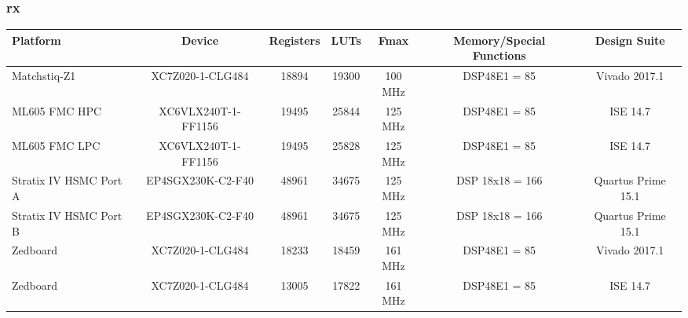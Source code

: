 \begin{scriptsize}
\subsubsection{rx}
\begin{tabular}{|P{1.8cm}|c|c|c|c|c|c|}
\hline
{}
Platform               & Device              & Registers & LUTs  & Fmax    & Memory/Special Functions & Design Suite       \\
\hline
Matchstiq-Z1           & XC7Z020-1-CLG484    & 18894     & 19300 & 100 MHz & DSP48E1 = 85             & Vivado 2017.1      \\
\hline
ML605 FMC HPC          & XC6VLX240T-1-FF1156 & 19495     & 25844 & 125 MHz & DSP48E1 = 85             & ISE 14.7           \\
\hline
ML605 FMC LPC          & XC6VLX240T-1-FF1156 & 19495     & 25828 & 125 MHz & DSP48E1 = 85             & ISE 14.7           \\
\hline
Stratix IV HSMC Port A & EP4SGX230K-C2-F40   & 48961     & 34675 & 125 MHz & DSP 18x18 = 166          & Quartus Prime 15.1 \\
\hline
Stratix IV HSMC Port B & EP4SGX230K-C2-F40   & 48961     & 34675 & 125 MHz & DSP 18x18 = 166          & Quartus Prime 15.1 \\
\hline
Zedboard               & XC7Z020-1-CLG484    & 18233     & 18459 & 161 MHz & DSP48E1 = 85             & Vivado 2017.1      \\
\hline
Zedboard               & XC7Z020-1-CLG484    & 13005     & 17822 & 161 MHz & DSP48E1 = 85             & ISE 14.7	       \\
\hline
\end{tabular}

\end{scriptsize}
